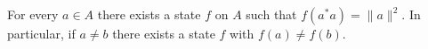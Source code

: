 For every $a \in A$ there exists a state $f$ on $A$ such that $f(a^*a) = \|a\|^2$. In particular, if $a \neq b$ there exists a state $f$ with $f(a) \neq f(b)$.
